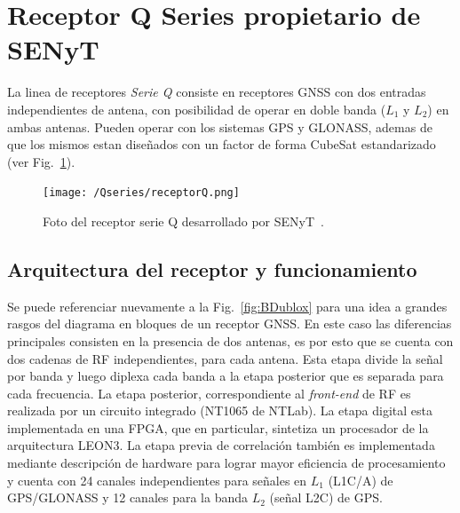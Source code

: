 \documentclass[a4paper,12pt,oneside,onecolumn,final,openright]{book}%
\begin{document}
\section{Receptor Q Series propietario de SENyT}
	La linea de receptores \textit{Serie Q} consiste en receptores GNSS con dos entradas independientes de antena, con posibilidad de operar en doble banda ($L_1$ y $L_2$) en ambas antenas. Pueden operar con los sistemas GPS y GLONASS, ademas de que los mismos estan diseñados con un factor de forma CubeSat estandarizado~\cite{Qseries_1}\cite{Qseries_2} (ver Fig.~\ref{fig:Q}).
\begin{figure}
    \centering
    \texttt{[image: /Qseries/receptorQ.png]}
    \caption{Foto del receptor serie Q desarrollado por SENyT~\cite{Qseries_2}.}
    \label{fig:Q}
\end{figure}
\subsection{Arquitectura del receptor y funcionamiento}\label{sec:Qarq}
	Se puede referenciar nuevamente a la Fig.~\ref{fig:BDublox} para una idea a grandes rasgos del diagrama en bloques de un receptor GNSS. En este caso las diferencias principales consisten en la presencia de dos antenas, es por esto que se cuenta con dos cadenas de RF independientes, para cada antena. Esta etapa divide la señal por banda y luego diplexa cada banda a la etapa posterior que es separada para cada frecuencia. La etapa posterior, correspondiente al \textit{front-end} de RF es realizada por un circuito integrado (NT1065 de NTLab). La etapa digital esta implementada en una FPGA, que en particular, sintetiza un procesador de la arquitectura LEON3. La etapa previa de correlación también es implementada mediante descripción de hardware para lograr mayor eficiencia de procesamiento y cuenta con 24 canales independientes para señales en $L_1$ (L1C/A) de GPS/GLONASS y 12 canales para la banda $L_2$ (señal L2C) de GPS.
\end{document}
